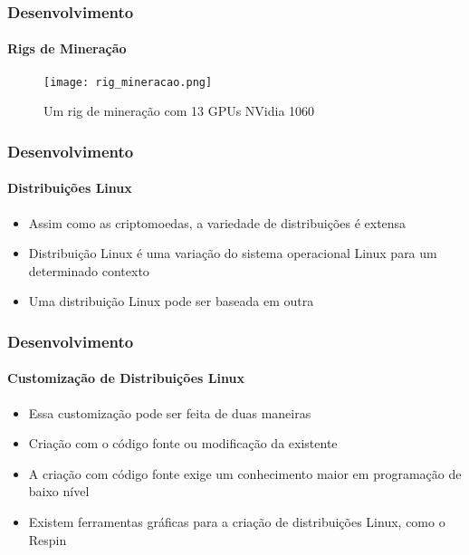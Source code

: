 \documentclass[aspectratio=43]{beamer}
\begin{document}
\begin{frame}
    \frametitle{Desenvolvimento}
    \framesubtitle{Rigs de Mineração}

    \begin{figure}[H]
        \caption{\label{fig:rig_mineracao}Um rig de mineração com 13 GPUs
        NVidia 1060}
        \begin{center}
            \texttt{[image: rig\_mineracao.png]}
        \end{center}
    \end{figure}
\end{frame}

\begin{frame}
    \frametitle{Desenvolvimento}
    \framesubtitle{Distribuições Linux}

    \begin{itemize}
        \item Assim como as criptomoedas, a variedade de distribuições
            é extensa

        \item Distribuição Linux é uma variação do sistema operacional
            Linux para um determinado contexto

        \item Uma distribuição Linux pode ser baseada em outra

    \end{itemize}
\end{frame}

\begin{frame}
    \frametitle{Desenvolvimento}
    \framesubtitle{Customização de Distribuições Linux}

    \begin{itemize}
        \item Essa customização pode ser feita de duas maneiras

        \item Criação com o código fonte ou modificação da existente

        \item A criação com código fonte exige um conhecimento maior
            em programação de baixo nível

        \item Existem ferramentas gráficas para a criação de
            distribuições Linux, como o Respin \cite{Respin2018}

    \end{itemize}
\end{frame}
\end{document}
